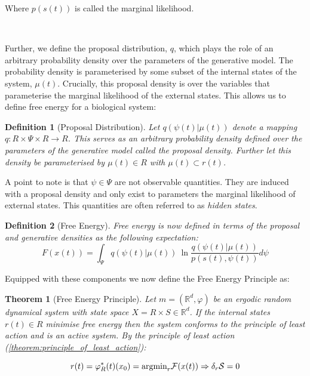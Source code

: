 \documentclass{article}
\newcommand{\refp}[1]{(\ref{#1})}
\newcommand{\R}{\mathbb{R}}
\newtheorem{theorem}{Theorem}
\newtheorem{definition}{Definition}
\begin{document}
Where $p(s(t))$ is called the marginal likelihood. 

\

Further, we define the proposal distribution, $q$, which plays the role of an arbitrary probability density over the parameters of the generative model. The probability density is parameterised by some subset of the internal states of the system, $\mu(t)$. Crucially, this proposal density is over the variables that parameterise the marginal likelihood of the external states. This allows us to define free energy for a biological system:

\begin{definition}[Proposal Distribution]\label{def:proposal_distribution}
Let $q(\psi(t) | \mu(t))$ denote a mapping $q: R \times \Psi \times R \to R$. This serves as an arbitrary probability density defined over the parameters of the generative model called the proposal density. Further let this density be parameterised by $\mu(t) \in R$ with $\mu(t) \subset r(t)$. 
\end{definition}

A point to note is that $\psi \in \Psi$ are not observable quantities. They are induced with a proposal density and only exist to parameters the marginal likelihood of external states. This quantities are often referred to as \textit{hidden states}.

\begin{definition}[Free Energy]\label{eq:free_energy}
Free energy is now defined in terms of the proposal and generative  densities as the following expectation:
$$
F(x(t)) = \int_\Psi q(\psi(t) | \mu(t))\ \ln\frac{q(\psi(t) | \mu(t))}{p(s(t), \psi(t))} d\psi
$$
\end{definition}

Equipped with these components we now define the Free Energy Principle as: 

\begin{theorem}[Free Energy Principle]\label{theorem:free_energy_principle}
Let $ m = (\R^d, \varphi)$ be an ergodic random dynamical system with state space $X = R \times S \in \R^d$. If the internal states $r(t) \in R$ minimise free energy then the system conforms to the principle of least action and is an active system. By the principle of least action \refp{theorem:principle_of_least_action}:

$$
r(t) = \varphi_R^*(t)(x_0) = \text{argmin}_{r} \mathcal{F}(x(t)) \Rightarrow \delta_r \mathcal{S} = 0 \\
$$
\end{theorem}
\end{document}
